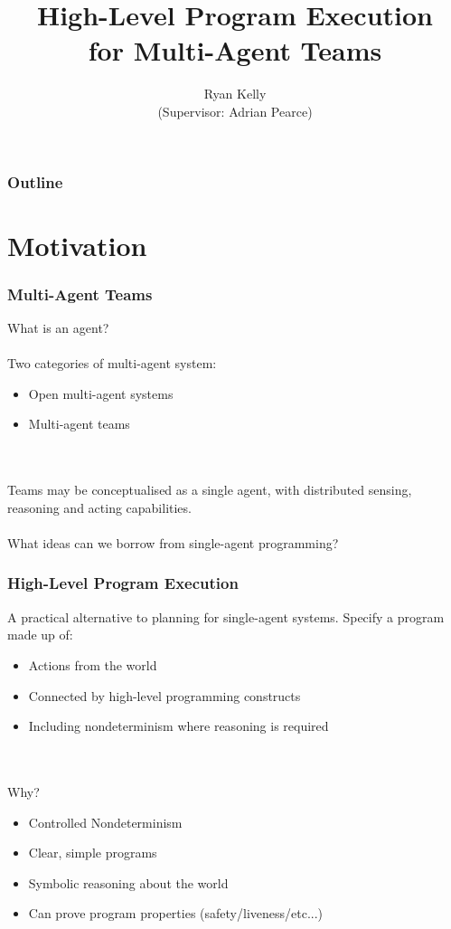 \documentclass{beamer}
\title{High-Level Program Execution\\ for Multi-Agent Teams}
\author{Ryan Kelly\\ (Supervisor: Adrian Pearce)}
\begin{document}
\begin{frame}
  \titlepage
\end{frame}

\begin{frame}
  \frametitle{Outline}
  \tableofcontents
\end{frame}

\section{Motivation}

\begin{frame}
\frametitle{Multi-Agent Teams}
What is an agent?
\ \\
\ \\
Two categories of multi-agent system:
\begin{itemize}
  \item Open multi-agent systems
  \item Multi-agent teams
\end{itemize}
\ \\
\ \\
\pause
Teams may be conceptualised as a single agent, with distributed sensing,
reasoning and acting capabilities.\\
\ \\
\pause
What ideas can we borrow from single-agent programming?
\end{frame}

\begin{frame}
\frametitle{High-Level Program Execution}
A practical alternative to planning for single-agent systems. Specify
a program made up of:
\begin{itemize}
  \item Actions from the world
  \item Connected by high-level programming constructs
  \item Including nondeterminism where reasoning is required
\end{itemize}
\ \\
\ \\
\pause
Why?
\begin{itemize}
  \item Controlled Nondeterminism
  \item Clear, simple programs
  \item Symbolic reasoning about the world
  \item Can prove program properties (safety/liveness/etc...)
\end{itemize}
\end{frame}
\end{document}
